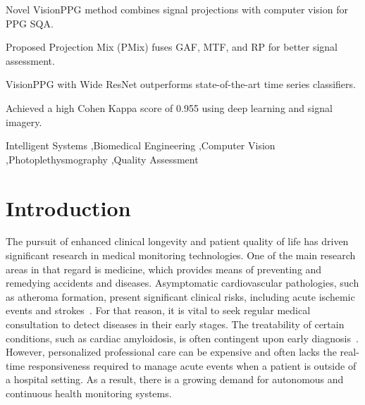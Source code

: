 \documentclass[final,3p,times,twocolumn]{elsarticle}
\begin{document}
\begin{frontmatter}

\begin{highlights}
\item Novel VisionPPG method combines signal projections with computer vision for PPG SQA.
\item Proposed Projection Mix (PMix) fuses GAF, MTF, and RP for better signal assessment.
\item VisionPPG with Wide ResNet outperforms state-of-the-art time series classifiers.
\item Achieved a high Cohen Kappa score of 0.955 using deep learning and signal imagery.
\end{highlights}

\begin{keyword}
Intelligent Systems \sep Biomedical Engineering \sep Computer Vision \sep Photoplethysmography \sep Quality Assessment
\end{keyword}

\end{frontmatter}

\linenumbers

\section{Introduction} \label{sec_intro}


The pursuit of enhanced clinical longevity and patient quality of life has driven significant research in medical monitoring technologies. 
One of the main research areas in that regard is medicine, which provides means of preventing and remedying accidents and diseases. 
Asymptomatic cardiovascular pathologies, such as atheroma formation, present significant clinical risks, including acute ischemic events and strokes~\cite{atheromas}.
For that reason, it is vital to seek regular medical consultation to detect diseases in their early stages. The treatability of certain conditions, such as cardiac amyloidosis, is often contingent upon early diagnosis~\cite{cardiac-amyloidosis}.
However, personalized professional care can be expensive and often lacks the real-time responsiveness required to manage acute events when a patient is outside of a hospital setting.
As a result, there is a growing demand for autonomous and continuous health monitoring systems.
\end{document}
